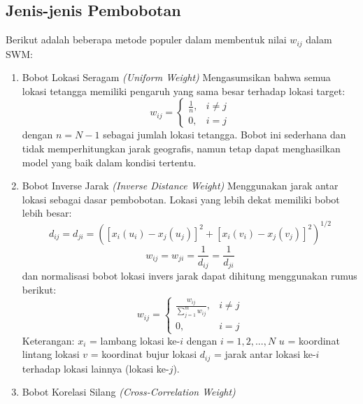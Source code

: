 \subsection{Jenis-jenis Pembobotan}
Berikut adalah beberapa metode populer dalam membentuk nilai $w_{ij}$ dalam SWM:
\begin{enumerate}[label=\alph*)]
    \item Bobot Lokasi Seragam \textit{(Uniform Weight)}
    Mengasumsikan bahwa semua lokasi tetangga memiliki pengaruh yang sama besar terhadap lokasi target:
    \begin{equation}\label{swm_uniform}
        w_{ij} = 
        \begin{cases}
        \frac{1}{n}, & i \ne j \\
        0, & i = j
        \end{cases}
    \end{equation}
    dengan $n = N - 1$ sebagai jumlah lokasi tetangga.
    Bobot ini sederhana dan tidak memperhitungkan jarak geografis, namun tetap dapat menghasilkan model yang baik dalam kondisi tertentu.
    \item Bobot Inverse Jarak \textit{(Inverse Distance Weight)}
    Menggunakan jarak antar lokasi sebagai dasar pembobotan. Lokasi yang lebih dekat memiliki bobot lebih besar:
    \begin{equation}\label{swm_inverse0}
        d_{ij} = d_{ji} = \left( \left[ x_i(u_i) - x_j(u_j) \right]^2 + \left[ x_i(v_i) - x_j(v_j) \right]^2 \right)^{1/2}
    \end{equation}
    \begin{equation}\label{swm_inverse}
        w_{ij} = w_{ji} = \frac{1}{d_{ij}} = \frac{1}{d_{ji}}
    \end{equation}
    dan normalisasi bobot lokasi invers jarak dapat dihitung menggunakan rumus berikut:
    \begin{equation}\label{swm_inverse1}
        w_{ij} =
        \begin{cases}
        \frac{w_{ij}}{\sum_{j=1}^{m} w_{ij}}, & i \ne j \\
        0, & i = j
        \end{cases}
    \end{equation}
    Keterangan:
    $x_i$    = lambang lokasi ke-$i$ dengan $i=1,2,...,N$
    $u$      = koordinat lintang lokasi
    $v$      = koordinat bujur lokasi
    $d_{ij}$ = jarak antar lokasi ke-$i$ terhadap lokasi lainnya (lokasi ke-$j$).
    \item Bobot Korelasi Silang \textit{(Cross-Correlation Weight)}

\end{enumerate}

